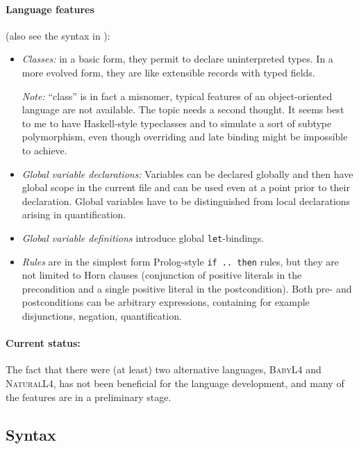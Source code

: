 \paragraph{Language features} (also see the syntax in ):
\begin{itemize}
\item \emph{Classes:} in a basic form, they permit to declare uninterpreted
  types. In a more evolved form, they are like extensible records with typed
  fields.

  \emph{Note:} ``class'' is in fact a misnomer, typical features of an
  object-oriented language are not available. The topic needs a second
  thought. It seems best to me to have Haskell-style typeclasses and to
  simulate a sort of subtype polymorphism, even though overriding and late
  binding might be impossible to achieve.

  
\item \emph{Global variable declarations:} Variables can be declared globally
  and then have global scope in the current file and can be used even at a
  point prior to their declaration. Global variables have to be distinguished
  from local declarations arising in quantification.
\item \emph{Global variable definitions} introduce global
  \texttt{let}-bindings.
  
\item \emph{Rules} are in the simplest form Prolog-style \texttt{if .. then}
  rules, but they are not limited to Horn clauses (conjunction of positive
  literals in the precondition and a single positive literal in the
  postcondition). Both pre- and postconditions can be arbitrary expressions,
  containing for example disjunctions, negation, quantification. 
\end{itemize}

\paragraph{Current status:} The fact that there were (at least) two
alternative languages, \textsc{BabyL4} and \textsc{NaturalL4}, has not been
beneficial for the language development, and many of the features are in a
preliminary stage.


\subsection{Syntax}\label{sec:syntax}


